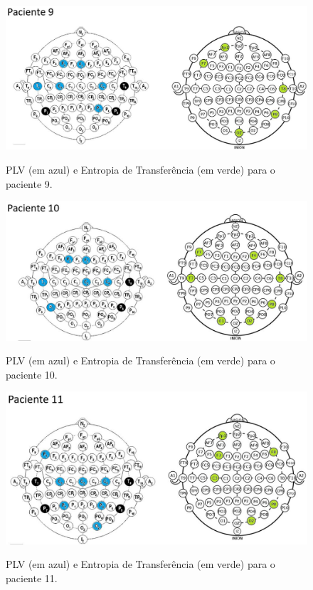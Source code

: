 \documentclass[
	12pt,				%
	openright,			%
	twoside,			%
	a4paper,			%
	english,			%
	french,				%
	spanish,			%
	brazil				%
	]{abntex2}
\begin{document}
\begin{figure}[]
\centering
\includegraphics[width=17cm]{figs/p9.JPG}
\label{eeg}
\caption{PLV (em azul) e Entropia de Transferência (em verde) para o paciente 9.}
\end{figure}

\begin{figure}[]
\centering
\includegraphics[width=17cm]{figs/p10.JPG}
\label{eeg}
\caption{PLV (em azul) e Entropia de Transferência (em verde) para o paciente 10.}
\end{figure}

\begin{figure}[]
\centering
\includegraphics[width=17cm]{figs/p11.JPG}
\label{eeg}
\caption{PLV (em azul) e Entropia de Transferência (em verde) para o paciente 11.}
\end{figure}
\end{document}
